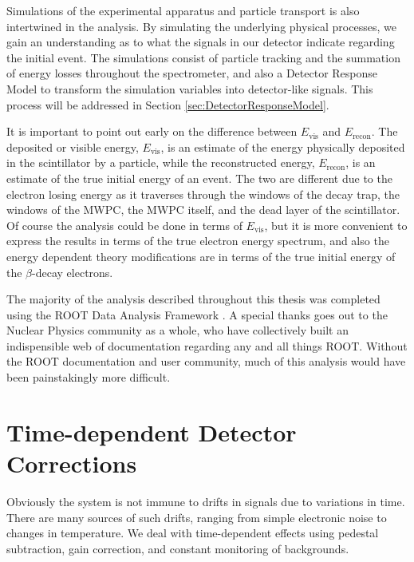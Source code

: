 Simulations of the experimental apparatus and particle transport is also intertwined
in the analysis. By simulating the underlying physical processes, we gain an understanding
as to what the signals in our detector indicate regarding the initial event. The simulations
consist of particle tracking and the summation of energy losses throughout
the spectrometer, and also a Detector Response Model to transform the simulation variables
into detector-like signals. This process will be addressed in Section \ref{sec:DetectorResponseModel}.

It is important to point out early on the difference between $E_{\mathrm{vis}}$ and
$E_{\mathrm{recon}}$. The deposited or visible energy, $E_{\mathrm{vis}}$, is an estimate of the energy
physically deposited in the
scintillator by a particle, while the reconstructed energy, $E_{\mathrm{recon}}$, is an estimate of
the true initial energy of an event. The two are different due to the electron losing energy
as it traverses through the windows of the decay trap, the windows of the MWPC,
the MWPC itself, and the dead layer of the scintillator. Of course the analysis could be
done in terms of $E_{\mathrm{vis}}$, but it is more convenient to express the results
in terms of the true electron energy spectrum, and also the energy dependent theory modifications
are in terms of the true initial energy of the $\beta$-decay electrons.

The majority of the analysis described throughout this thesis was completed using
the ROOT Data Analysis Framework \cite{brun1997root}. A special thanks goes out to
the Nuclear Physics community as a whole, who have collectively built an indispensible
web of documentation regarding any and all things ROOT. Without the ROOT documentation
and user community, much of this analysis would have been painstakingly more difficult.




\section{Time-dependent Detector Corrections}

Obviously the system is not immune to drifts in signals due to variations
in time. There are many sources of such drifts, ranging from simple
electronic noise to changes in temperature. We deal with time-dependent
effects using pedestal subtraction, gain correction, and constant monitoring
of backgrounds.

